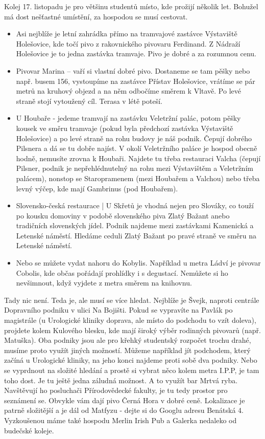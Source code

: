 Kolej 17. listopadu je pro většinu studentů místo, kde prožijí několik let. Bohužel má dost nešťastné umístění, za hospodou se musí cestovat.
\begin{itemize}
    \item Asi nejblíže je letní zahrádka přímo na tramvajové zastávce Výstaviště Holešovice, kde točí pivo z rakovnického pivovaru Ferdinand. Z Nádraží Holešovice je to jedna zastávka tramvaje. Pivo je dobré a za rozumnou cenu.
    \item Pivovar Marina – vaří si vlastní dobré pivo. Dostaneme se tam pěšky nebo např. busem 156, vystoupíme na zastávce Přístav Holešovice, vrátíme se pár metrů na kruhový objezd a na něm odbočíme směrem k Vltavě. Po levé straně stojí vytoužený cíl. Terasa v létě poteší.
    \item U Houbaře - jedeme tramvají na zastávku Veletržní palác, potom pěšky kousek ve směru tramvaje (pokud byla předchozí zastávka Výstaviště Holešovice) a po levé straně na rohu budovy je náš podnik. Čepují dobrého Pilsnera a dá se tu dobře najíst. V okolí Veletržního paláce je hospod obecně hodně, nemusíte zrovna k Houbaři. Najdete tu třeba restauraci Valcha (čepují Pilsner, podnik je nepřehlédnutelný na rohu mezi Výstavištěm a Veletržním palácem), nonstop se Staropramenem (mezi Houbařem a Valchou) nebo třeba levný výčep, kde mají Gambrinus (pod Houbařem).
    \item Slovensko-česká restaurace | U Skřetů je vhodná nejen pro Slováky, co touží po kousku domoviny v podobě slovenského piva Zlatý Bažant anebo tradičních slovenských jídel. Podnik najdeme mezi zastávkami Kamenická a Letenské náměstí. Hledáme ceduli Zlatý Bažant po pravé straně ve směru na Letenské náměstí.
    \item Nebo se můžete vydat nahoru do Kobylis. Například u metra Ládví je pivovar Cobolis, kde občas pořádají prohlídky i s degustací. Nemůžete si ho nevšimnout, když vyjdete z metra směrem na knihovnu.
\end{itemize}

Tady nic není. Teda je, ale musí se více hledat. Nejblíže je Švejk, naproti centrále Dopravního podniku v ulici Na Bojišti. Pokud se vypravíte na Pavlák po magistrále (u Urologické kliniky doprava, ale místo do podchodu to vzít doleva), projdete kolem Kulového blesku, kde mají široký výběr rodinných pivovarů (např. Matuška). Oba podniky jsou ale pro křehký studentský rozpočet trochu drahé, musíme proto využít jiných možností. Můžeme například jít podchodem, který začíná u Urologické kliniky, na jeho konci najdeme proti sobě dva podniky. Nebo se vyprdnout na složité hledání a prostě si vybrat něco kolem metra I.P.P, je tam toho dost. Je tu ještě jedna záludná možnost. A to využít bar Mrtvá ryba. Navštěvují ho posluchači Přírodovědecké fakulty, je tu tedy prostor pro seznámení se. Obvykle vám dají pivo Černá Hora v dobré ceně. Lokalizace je patrně složitější a je dál od Matfyzu - dejte si do Googlu adresu Benátská 4. Vyzkoušenou máme také hospodu Merlin Irish Pub a Galerka nedaleko od budečské koleje.

